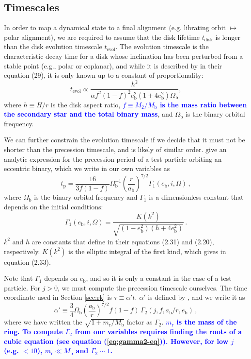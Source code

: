 \documentclass[twocolumn,linenumbers]{aastex631}
\newcommand{\RR}[1]{\textcolor{blue}{\bf#1}} %
\begin{document}
\subsection{Timescales}
In order to map a dynamical state to a final alignment (e.g. librating orbit $\mapsto$ polar alignment), we are required to assume that the disk lifetime $t_\text{disk}$ is longer than the disk evolution timescale $t_\text{evol}$. The evolution timescale is the characteristic decay time for a disk whose inclination has been perturbed from a stable point (e.g., polar or coplanar), and while it is described by \citet{lubow2018} in their equation (29), it is only known up to a constant of proportionality:
\begin{equation}
    \label{eq:tevol}
    t_\text{evol} \propto \frac{h^2}{\alpha f^2(1-f)^2 e_\text{b}^2(1+4e_\text{b}^2) \Omega_\text{b}} ,
\end{equation}
where $h\equiv H/r$ is the disk aspect ratio, \RR{$f\equiv M_2/M_\text{b}$ is the mass ratio between the secondary star and the total binary mass}, and $\Omega_\text{b}$ is the binary orbital frequency. 

We can further constrain the evolution timescale if we decide that it must not be shorter than the precession timescale, and is likely of similar order. \citet[see eq. (2.32)]{farago2010} give an analytic expression for the precession period of a test particle orbiting an eccentric binary, which we write in our own variables as
\begin{equation}
    t_\text{p} = \frac{16}{3f(1-f)} \Omega_\text{b}^{-1} \left(\frac{r}{a_\text{b}}\right)^{7/2} \Gamma_1(e_\text{b},i,\Omega)\, ,
\end{equation}
where $\Omega_\text{b}$ is the binary orbital frequency and $\Gamma_1$ is a dimensionless constant that depends on the initial conditions:
\begin{equation}
    \Gamma_1(e_\text{b},i,\Omega) = \frac{K(k^2)}{\sqrt{(1-e_\text{b}^2)(h+4e_\text{b}^2)}} \, .
\end{equation}
$k^2$ and $h$ are constants that \citet{farago2010} define in their equations (2.31) and (2.20), respectively. $K(k^2)$ is the elliptic integral of the first kind, which \citet{farago2010} gives in equation (2.33).

Note that $\Gamma_1$ depends on $e_\text{b}$, and so it is only a constant in the case of a test particle. For $j>0$, we must compute the precession timescale ourselves. The time coordinate used in Section \ref{sec:rk} is $\tau \equiv \alpha' t$. $\alpha'$ is defined by \citet[see eq. 3.9]{farago2010}, and we write it as
\begin{equation}
    \alpha' \equiv \frac{3}{4} \Omega_\text{b} \left(\frac{a_\text{b}}{r}\right)^{7/2} f(1-f) \,\Gamma_2(j,f,a_\text{b}/r, e_\text{b}) \, ,
\end{equation}
where we have written the $\sqrt{1+m_\text{r}/M_\text{b}}$ factor as $\Gamma_2$. \RR{$m_\text{r}$ is the mass of the ring. To compute $\Gamma_2$ from our variables requires finding the roots of a cubic equation (see equation (\ref{eq:gamma2-eq})). However, for low $j$ (e.g. $<10$), $m_\text{r} \ll M_\text{b}$ and $\Gamma_2 \sim 1$.}
\end{document}

